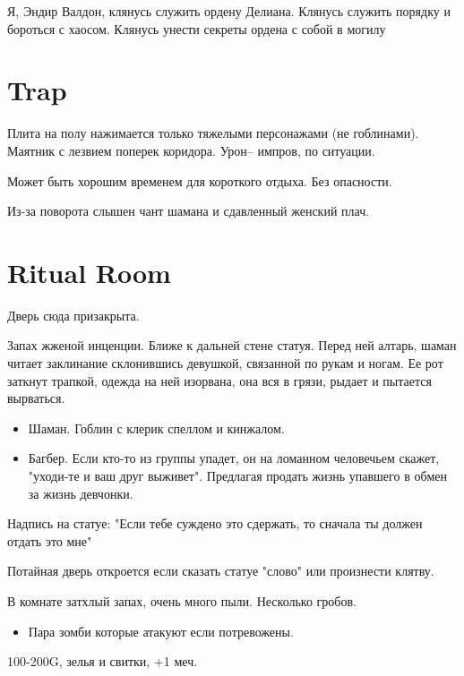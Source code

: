 \documentclass[a4paper,11pt]{book}
\begin{document}
\begin{multicols}{2}
\begin{framed}
Я, Эндир Валдон, клянусь служить ордену Делиана. Клянусь служить порядку и бороться с хаосом. Клянусь унести секреты ордена с собой в могилу
\end{framed}

\section{Trap}
Плита на полу нажимается только тяжелыми персонажами (не гоблинами). Маятник с лезвием поперек коридора. Урон-- импров, по ситуации.

Может быть хорошим временем для короткого отдыха. Без опасности.

Из-за поворота слышен чант шамана и сдавленный женский плач.

\section{Ritual Room}
Дверь сюда призакрыта.

Запах жженой инценции. Ближе к дальней стене статуя. Перед ней алтарь, шаман читает заклинание склонившись девушкой, связанной по рукам и ногам. Ее рот заткнут трапкой, одежда на ней изорвана, она вся в грязи, рыдает и пытается вырваться.

\begin{itemize}
  \item Шаман. Гоблин с клерик спеллом и кинжалом.
  \item Багбер. Если кто-то из группы упадет, он на ломанном человечьем скажет, "уходи-те и ваш друг выживет". Предлагая продать жизнь упавшего в обмен за жизнь девчонки.
\end{itemize}

\begin{framed}
Надпись на статуе: "Если тебе суждено это сдержать, то сначала ты должен отдать это мне"
\end{framed}

Потайная дверь откроется если сказать статуе "слово" или произнести клятву.

В комнате затхлый запах, очень много пыли. Несколько гробов.

\begin{itemize}
  \item Пара зомби которые атакуют если потревожены.
\end{itemize}

100-200G, зелья и свитки, +1 меч.


\end{multicols}
\end{document}
